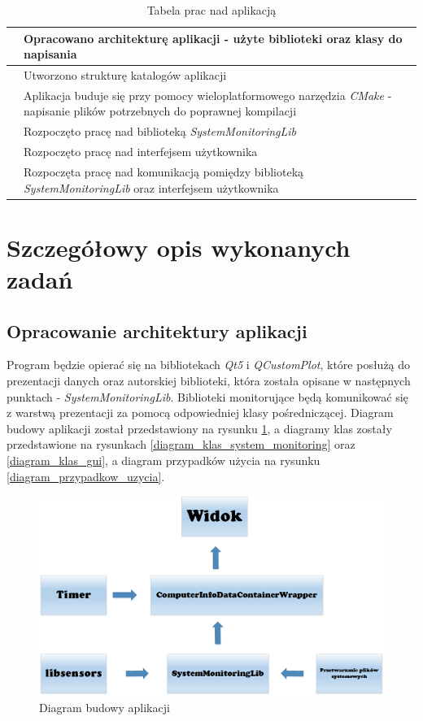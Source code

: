 \documentclass[a4paper]{article}
\newcounter{counter}
\newcommand\rownumber{\stepcounter{counter}\arabic{counter}}
\begin{document}
\begin{table}[h]
\centering
\begin{tabularx}{0.7\linewidth}{ |c|X| }
			\hline 
			\rownumber & Opracowano architekturę aplikacji - użyte biblioteki oraz 
						 klasy do napisania\\ \hline
			\rownumber & Utworzono strukturę katalogów aplikacji \\ \hline
			\rownumber & Aplikacja buduje się przy pomocy wieloplatformowego narzędzia 
						 \textit{CMake} - napisanie plików potrzebnych do poprawnej kompilacji \\ \hline
			\rownumber & Rozpoczęto pracę nad biblioteką \textit{SystemMonitoringLib} \\ \hline
			\rownumber & Rozpoczęto pracę nad interfejsem użytkownika \\ \hline
			\rownumber & Rozpoczęta pracę nad komunikacją pomiędzy biblioteką \textit{SystemMonitoringLib} oraz interfejsem użytkownika \\ \hline
	\end{tabularx}
	\caption{Tabela prac nad aplikacją}
\end{table}

\section{Szczegółowy opis wykonanych zadań}

\subsection{Opracowanie architektury aplikacji}
Program będzie opierać się na bibliotekach \textit{Qt5} i \textit{QCustomPlot}, które posłużą do prezentacji danych oraz autorskiej biblioteki, która została opisane w następnych punktach - \textit{SystemMonitoringLib}. Biblioteki monitorujące będą komunikować się z warstwą prezentacji za pomocą odpowiedniej klasy pośredniczącej. Diagram budowy aplikacji został przedstawiony na rysunku \ref{diagram_budowy_aplikacji}, a diagramy klas zostały przedstawione na rysunkach \ref{diagram_klas_system_monitoring} oraz \ref{diagram_klas_gui}, a diagram przypadków użycia na rysunku \ref{diagram_przypadkow_uzycia}.

\begin{figure}[h]
	\centering
	\includegraphics[width=\linewidth]{img/diagramBudowyAplikacji.png}
	\caption{Diagram budowy aplikacji}
	\label{diagram_budowy_aplikacji}
\end{figure}
\end{document}
